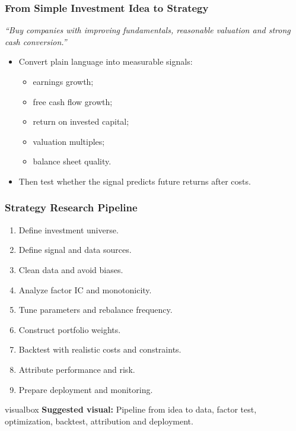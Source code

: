\documentclass[aspectratio=169,12pt]{beamer}
\newcommand{\currentframetitle}{}
\newcommand{\slideTitle}[1]{\gdef\currentframetitle{#1}\frametitle{#1}}
\newcommand{\visual}[1]{%
  \vspace{0.12cm}
  \begin{beamercolorbox}[wd=\linewidth,rounded=true,sep=0.16cm]{visualbox}
    \scriptsize\textbf{Suggested visual:} #1
  \end{beamercolorbox}%
}
\begin{document}
\begin{frame}
\slideTitle{From Simple Investment Idea to Strategy}
\begin{center}
\Large\textit{``Buy companies with improving fundamentals, reasonable valuation and strong cash conversion.''}
\end{center}
\vspace{0.2cm}
\begin{itemize}
  \item Convert plain language into measurable signals:
  \begin{itemize}
    \item earnings growth;
    \item free cash flow growth;
    \item return on invested capital;
    \item valuation multiples;
    \item balance sheet quality.
  \end{itemize}
  \item Then test whether the signal predicts future returns after costs.
\end{itemize}
\end{frame}

\begin{frame}
\slideTitle{Strategy Research Pipeline}
\begin{enumerate}
  \item Define investment universe.
  \item Define signal and data sources.
  \item Clean data and avoid biases.
  \item Analyze factor IC and monotonicity.
  \item Tune parameters and rebalance frequency.
  \item Construct portfolio weights.
  \item Backtest with realistic costs and constraints.
  \item Attribute performance and risk.
  \item Prepare deployment and monitoring.
\end{enumerate}
\visual{Pipeline from idea to data, factor test, optimization, backtest, attribution and deployment.}
\end{frame}
\end{document}

